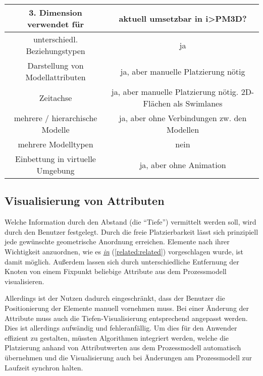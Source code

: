\documentclass[a4paper,10pt]{sphinxmanual}
\begin{document}
\begin{DUlineblock}{0em}
\item[] 
\end{DUlineblock}
\begin{tabular}{|c|c|}
\hline
3. Dimension verwendet für & aktuell umsetzbar in i>PM3D?\tabularnewline
\hline
\hline
unterschiedl. Beziehungstypen & ja\tabularnewline
\hline
Darstellung von Modellattributen & ja, aber manuelle Platzierung nötig\tabularnewline
\hline
Zeitachse & ja, aber manuelle Platzierung nötig. 2D-Flächen als Swimlanes\tabularnewline
\hline
mehrere / hierarchische Modelle & ja, aber ohne Verbindungen zw. den Modellen\tabularnewline
\hline
mehrere Modelltypen & nein\tabularnewline
\hline
Einbettung in virtuelle Umgebung & ja, aber ohne Animation\tabularnewline
\hline
\end{tabular}
\begin{DUlineblock}{0em}
\item[] 
\end{DUlineblock}


\subsection{Visualisierung von Attributen}
\label{visualisierung:visualisierung-von-attributen}
Welche Information durch den Abstand (die "`Tiefe"') vermittelt werden soll, wird durch den Benutzer festgelegt.
Durch die freie Platzierbarkeit lässt sich prinzipiell jede gewünschte geometrische Anordnung erreichen.
Elemente nach ihrer Wichtigkeit anzuordnen, wie es {\hyperref[related:related]{\emph{in}}} (\autoref*{related:related}) vorgeschlagen wurde, ist damit möglich.
Außerdem lassen sich durch unterschiedliche Entfernung der Knoten von einem Fixpunkt beliebige Attribute aus dem Prozessmodell visualisieren.

Allerdings ist der Nutzen dadurch eingeschränkt, dass der Benutzer die Positionierung der Elemente manuell vornehmen muss.
Bei einer Änderung der Attribute muss auch die Tiefen-Visualisierung entsprechend angepasst werden. Dies ist allerdings aufwändig und fehleranfällig.
Um dies für den Anwender effizient zu gestalten, müssten Algorithmen integriert werden, welche die Platzierung anhand von Attributwerten aus dem Prozessmodell automatisch übernehmen und die Visualisierung auch bei Änderungen am Prozessmodell zur Laufzeit synchron halten.
\end{document}
